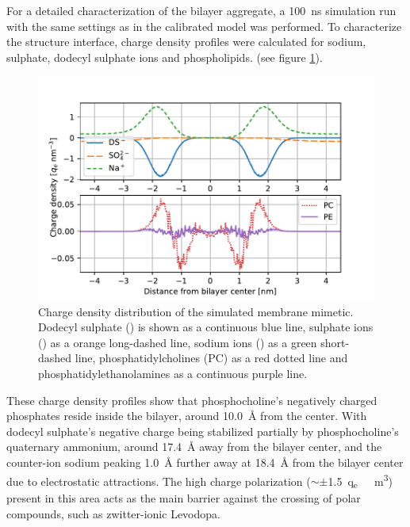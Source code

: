 \documentclass[3p,preprint,review]{elsarticle}
\begin{document}
	For a detailed characterization of the bilayer aggregate, a \SI{100}{ns}
	simulation run with the same settings as in the calibrated model was performed.
	To characterize the structure
	interface, charge density profiles were calculated for sodium, sulphate,
	dodecyl sulphate ions and phospholipids. (see figure \ref{fig:charge_density}).
	
	\begin{figure}[htb]
		\centering
		\includegraphics[width=\columnwidth]{charge_density}
		\caption{Charge density distribution of the simulated membrane mimetic. Dodecyl sulphate () is shown as a continuous blue line, sulphate ions () as a orange long-dashed line, sodium ions () as a green short-dashed line, phosphatidylcholines (PC) as a red dotted line and phosphatidylethanolamines as a continuous purple line.}
		\label{fig:charge_density}
	\end{figure}
	
	These charge density profiles show that phosphocholine's negatively charged
	phosphates reside inside the bilayer, around \SI{10.0}{\angstrom} from the
	center. With dodecyl sulphate's negative charge being stabilized partially by
	phosphocholine's quaternary ammonium, around \SI{17.4}{\angstrom} away from the
	bilayer center, and the counter-ion sodium peaking \SI{1.0}{\angstrom} further
	away at \SI{18.4}{\angstrom} from the bilayer
	center due to electrostatic attractions. The
	high charge polarization ($\sim\pm$\SI{1.5}{q_e \per\nano\cubic\meter}) present
	in
	this area acts as the main barrier against the crossing of polar compounds,
	such as
	zwitter-ionic Levodopa.\\
	
\end{document}
